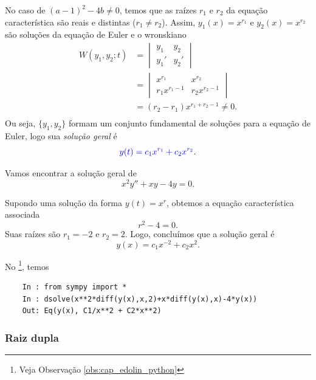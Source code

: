 No caso de $(a-1)^2-4b\neq 0$, temos que as raízes $r_1$ e $r_2$ da equação característica são reais e distintas ($r_1\neq r_2$). Assim, $y_1(x) = x^{r_1} $ e $y_2(x) = x^{r_2}$ são soluções da equação de Euler e o wronskiano
\begin{align}
  W(y_1,y_2;t) &=
  \begin{vmatrix}
    y_1 & y_2 \\
    y_1' & y_2'
  \end{vmatrix} \\
  &=
  \begin{vmatrix}
    x^{r_1} & x^{r_2} \\
    r_1x^{r_1-1} & r_2x^{r_2-1}
  \end{vmatrix} \\
  &= (r_2-r_1)x^{r_1+r_2-1} \neq 0.\\
\end{align}
Ou seja, $\{y_1,y_2\}$ formam um conjunto fundamental de soluções para a equação de Euler, logo sua \emph{solução geral} é
\begin{equation}
  {\color{blue}y(t) = c_1x^{r_1} + c_2x^{r_2}}.
\end{equation}

\begin{ex}
  Vamos encontrar a solução geral de
  \begin{equation}
    x^2y'' + xy -4y = 0.
  \end{equation}

  Supondo uma solução da forma $y(t) = x^r$, obtemos a equação característica associada
  \begin{equation}
    r^2 - 4 = 0.
  \end{equation}
  Suas raízes são $r_1 = -2$ e $r_2 = 2$. Logo, concluímos que a solução geral é
  \begin{equation}
    y(x) = c_1x^{-2} + c_2x^2.
  \end{equation}

  \ifispython
  No \python\footnote{Veja Observação \ref{obs:cap_edolin_python}}, temos
  \begin{lstlisting}
    In : from sympy import *
    In : dsolve(x**2*diff(y(x),x,2)+x*diff(y(x),x)-4*y(x))
    Out: Eq(y(x), C1/x**2 + C2*x**2)
  \end{lstlisting}
  \fi
\end{ex}

\subsubsection{Raiz dupla}

